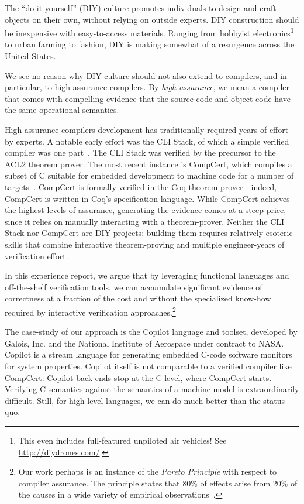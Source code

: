 \documentclass[preprint]{sigplanconf}
\begin{document}

The ``do-it-yourself'' (DIY) culture promotes individuals to design and craft
objects on their own, without relying on outside experts.  DIY construction
should be inexpensive with easy-to-access materials.  Ranging from hobbyist
electronics\footnote{This even includes full-featured unpiloted air vehicles!
  See \url{http://diydrones.com/}.} to urban farming to fashion, DIY is making
somewhat of a resurgence across the United States.

We see no reason why DIY culture should not also extend to compilers, and in
particular, to high-assurance compilers.  By \emph{high-assurance}, we mean a
compiler that comes with compelling evidence that the source code and object
code have the same operational semantics.

High-assurance compilers development has traditionally required years of effort
by experts.  A notable early effort was the CLI Stack, of which a simple
verified compiler was one part~\cite{cli}.  The CLI Stack was verified by the
precursor to the ACL2 theorem prover.  The most recent instance is CompCert,
which compiles a subset of C suitable for embedded development to machine code
for a number of targets~\cite{leroy}.  CompCert is formally verified in the Coq
theorem-prover---indeed, CompCert is written in Coq's specification language.
While CompCert achieves the highest levels of assurance, generating the evidence
comes at a steep price, since it relies on manually interacting with a
theorem-prover.  Neither the CLI Stack nor CompCert are DIY projects:
building them requires relatively esoteric skills that combine interactive
theorem-proving and multiple engineer-years of verification effort.

In this experience report, we argue that by leveraging functional languages and
off-the-shelf verification tools, we can accumulate significant evidence of
correctness at a fraction of the cost and without the specialized know-how
required by interactive verification approaches.\footnote{Our work perhaps
  is an instance of the \emph{Pareto Principle} with respect to compiler assurance.  The
  principle states that 80\% of effects arise from 20\% of the causes in a wide
  variety of empirical observations~\cite{pareto}.}  

The case-study of our approach is the Copilot language and toolset, developed by
Galois, Inc. and the National Institute of Aerospace under contract to NASA.
Copilot is a stream language for generating embedded C-code software monitors
for system properties.  Copilot itself is not comparable to a verified compiler
like CompCert: Copilot back-ends stop at the C level, where CompCert starts.
Verifying C semantics against the semantics of a machine model is
extraordinarily difficult.  Still, for high-level languages, we can do much
better than the status quo.
\end{document}
